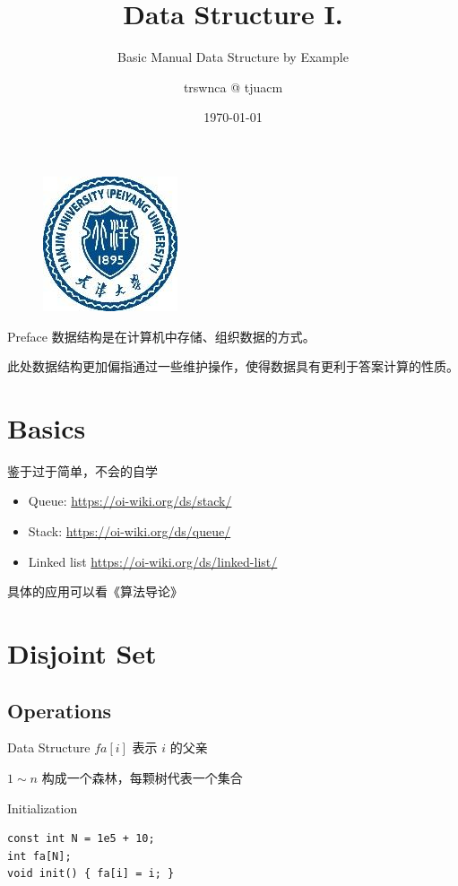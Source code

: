 \documentclass{beamer}
\author{trswnca @ tjuacm}
\title{Data Structure I.}
\subtitle{Basic Manual Data Structure by Example}
\institute{2021 TJU Summer Camp}
\date{\today}
\begin{document}
\begin{frame}
	\titlepage
	\begin{figure}[htpb]
		\begin{center}
			\includegraphics[width=0.15\linewidth]{pic/tju.png}
		\end{center}
	\end{figure}
\end{frame}

\begin{frame}{Preface}
  数据结构是在计算机中存储、组织数据的方式。
  
  此处数据结构更加偏指通过一些维护操作，使得数据具有更利于答案计算的性质。

\end{frame}

\begin{frame}
\tableofcontents[subsectionstyle=hide]
\end{frame}

\section{Basics}

\begin{frame}
  鉴于过于简单，不会的自学
  \begin{itemize}
    \item Queue: \url{https://oi-wiki.org/ds/stack/}
    \item Stack: \url{https://oi-wiki.org/ds/queue/}
    \item Linked list \url{https://oi-wiki.org/ds/linked-list/}
  \end{itemize}

  具体的应用可以看《算法导论》
\end{frame}

\section{Disjoint Set}
\subsection{Operations}

\begin{frame}[fragile]{Data Structure}
  $fa[i]$ 表示 $i$ 的父亲

  $1 \sim n$ 构成一个森林，每颗树代表一个集合
    
  \begin{block}{Initialization}
  \begin{lstlisting}
const int N = 1e5 + 10;
int fa[N];
void init() { fa[i] = i; }
  \end{lstlisting}
  \end{block}
  
\end{frame}
\end{document}
